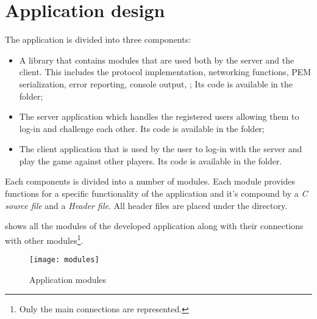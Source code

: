 \chapter{Application design}\label{ch:design}

The application is divided into three components:
\begin{itemize}
	\item[\standout{Common}] A library that contains modules that are used
		both by the server and the client. This includes the protocol
		implementation, networking functions, PEM serialization, error
		reporting, console output, \etc; Its code is available in the
		 folder;
	\item[\standout{Server}] The server application which handles the
		registered users allowing them to log-in and challenge each
		other. Its code is available in the  folder;
	\item[\standout{Client}] The client application that is used by the user
		to log-in with the server and play the game against other
		players. Its code is available in the  folder.
\end{itemize}

Each components is divided into a number of modules. Each module provides
functions for a specific functionality of the application and it's compound by a
\emph{C source file} and a \emph{Header file}. All header files are placed under
the  directory.

 shows all the modules of the developed application along
with their connections with other modules\footnote{Only the main connections are
represented.}.

\begin{figure}[htb]
	\texttt{[image: modules]}
	\caption{Application modules}\label{fig:modules}
\end{figure}




